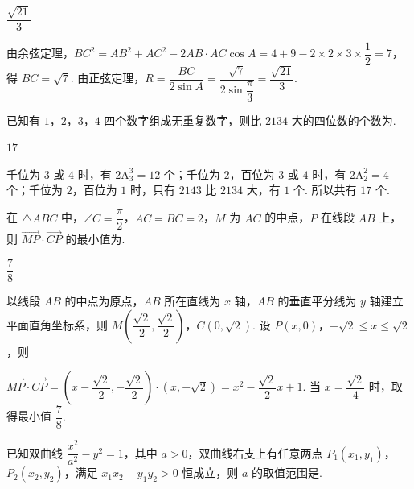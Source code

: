 \begin{answer}
\(\dfrac{\sqrt{21}}3\)
\end{answer}

\begin{solution}
由余弦定理，\(BC^2=AB^2+AC^2-2AB\cdot AC\cos A=4+9-2\times2\times3\times\dfrac12=7\)，得 \(BC=\sqrt7\). 由正弦定理，\(R=\dfrac{BC}{2\sin A}=\dfrac{\sqrt7}{2\sin\dfrac\pi3}=\dfrac{\sqrt{21}}3\).
\end{solution}

\begin{problem}
已知有 \(1\)，\(2\)，\(3\)，\(4\) 四个数字组成无重复数字，则比 \(2134\) 大的四位数的个数为\fillinblank{}.
\end{problem}

\begin{answer}
\(17\)
\end{answer}

\begin{solution}
千位为 \(3\) 或 \(4\) 时，有 \(2\mathrm A_3^3=12\) 个；千位为 \(2\)，百位为 \(3\) 或 \(4\) 时，有 \(2\mathrm A_2^2=4\) 个；千位为 \(2\)，百位为 \(1\) 时，只有 \(2143\) 比 \(2134\) 大，有 \(1\) 个. 所以共有 \(17\) 个.
\end{solution}

\begin{problem}
在 \(\triangle ABC\) 中，\(\angle C=\dfrac\pi2\)，\(AC=BC=2\)，\(M\) 为 \(AC\) 的中点，\(P\) 在线段 \(AB\) 上，则 \(\overrightarrow{MP}\cdot\overrightarrow{CP}\) 的最小值为\fillinblank{}.
\end{problem}

\begin{answer}
\(\dfrac78\)
\end{answer}

\begin{solution}
以线段 \(AB\) 的中点为原点，\(AB\) 所在直线为 \(x\) 轴，\(AB\) 的垂直平分线为 \(y\) 轴建立平面直角坐标系，则 \(M\left(\dfrac{\sqrt2}{2},\dfrac{\sqrt2}{2}\right)\)，\(C(0,\sqrt2)\). 设 \(P(x,0)\)，\(-\sqrt2\le x\le\sqrt2\)，则

\(\overrightarrow{MP}\cdot\overrightarrow{CP}=\left(x-\dfrac{\sqrt2}{2},-\dfrac{\sqrt2}{2}\right)\cdot(x,-\sqrt2)=x^2-\dfrac{\sqrt2}{2}x+1\). 当 \(x=\dfrac{\sqrt2}{4}\) 时，取得最小值 \(\dfrac78\).
\end{solution}

\begin{problem}
已知双曲线 \(\dfrac{x^2}{a^2}-y^2=1\)，其中 \(a>0\)，双曲线右支上有任意两点 \(P_1(x_1,y_1)\)，\(P_2(x_2,y_2)\)，满足 \(x_1x_2-y_1y_2>0\) 恒成立，则 \(a\) 的取值范围是\fillinblank{}.
\end{problem}

